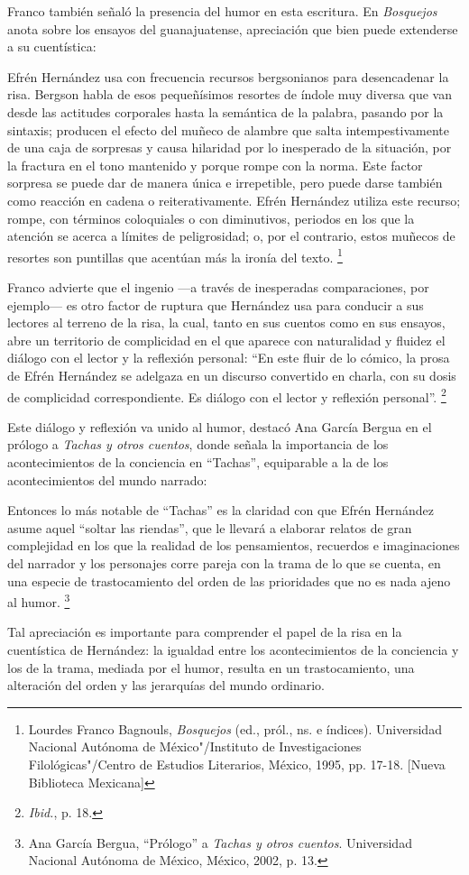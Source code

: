 \documentclass[14pt,twoside,final]{extbook} %
\let\oldfootnote\footnote
\renewcommand\footnote[1]{%
\oldfootnote{\hspace{1mm}#1}}
\begin{document}
Franco también señaló la presencia del humor en esta escritura. En \emph{Bosquejos} anota sobre los ensayos del guanajuatense, apreciación que bien puede extenderse a su cuentística:
\begin{quoting}
Efrén Hernández usa con frecuencia recursos bergsonianos para desencadenar la risa. Bergson habla de esos pequeñísimos resortes de índole muy diversa que van desde las actitudes corporales hasta la semántica de la palabra, pasando por la sintaxis; producen el efecto del muñeco de alambre que salta intempestivamente de una caja de sorpresas y causa hilaridad por lo inesperado de la situación, por la fractura en el tono mantenido y porque rompe con la norma. Este factor sorpresa se puede dar de manera única e irrepetible, pero puede darse también como reacción en cadena o reiterativamente. Efrén Hernández utiliza este recurso; rompe, con términos coloquiales o con diminutivos, periodos en los que la atención se acerca a límites de peligrosidad; o, por el contrario, estos muñecos de resortes son puntillas que acentúan más la ironía del texto.\footnote{Lourdes Franco Bagnouls, \emph{Bosquejos} (ed., pról., ns. e índices). Universidad Nacional Autónoma de México"/Instituto de Investigaciones Filológicas"/Centro de Estudios Literarios, México, 1995, pp. 17-18. [Nueva Biblioteca Mexicana]}
\end{quoting}
Franco advierte que el ingenio ---a través de inesperadas comparaciones, por ejemplo--- es otro factor de ruptura que Hernández usa para conducir a sus lectores al terreno de la risa, la cual, tanto en sus cuentos como en sus ensayos, abre un territorio de complicidad en el que aparece con naturalidad y fluidez el diálogo con el lector y la reflexión personal: ``En este fluir de lo cómico, la prosa de Efrén Hernández se adelgaza en un discurso convertido en charla, con su dosis de complicidad correspondiente. Es diálogo con el lector y reflexión personal''.\footnote{\emph{Ibid.}, p. 18.}

Este diálogo y reflexión va unido al humor, destacó Ana García Bergua en el prólogo a \emph{Tachas y otros cuentos}, donde señala la importancia de los acontecimientos de la conciencia en ``Tachas'', equiparable a la de los acontecimientos del mundo narrado:
\begin{quoting}
Entonces lo más notable de ``Tachas'' es la claridad con que Efrén Hernández asume aquel ``soltar las riendas'', que le llevará a elaborar relatos de gran complejidad en los que la realidad de los pensamientos, recuerdos e imaginaciones del narrador y los personajes corre pareja con la trama de lo que se cuenta, en una especie de trastocamiento del orden de las prioridades que no es nada ajeno al humor.\footnote{Ana García Bergua, ``Prólogo'' a \emph{Tachas y otros cuentos}. Universidad Nacional
Autónoma de México, México, 2002, p. 13.}
\end{quoting}
Tal apreciación es importante para comprender el papel de la risa en la cuentística de Hernández: la igualdad entre los acontecimientos de la conciencia y los de la trama, mediada por el humor, resulta en un trastocamiento, una alteración del orden y las jerarquías del mundo ordinario.
\end{document}
